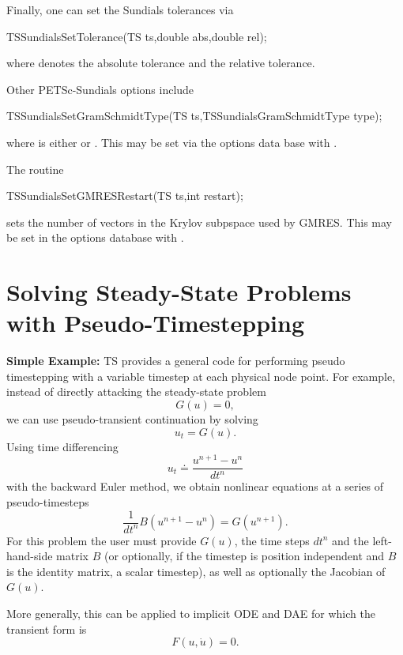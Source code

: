 Finally, one can set the Sundials tolerances via
\begin{tabbing}
 TSSundialsSetTolerance(TS ts,double abs,double rel);
\end{tabbing}
where  denotes the absolute tolerance and 
the relative tolerance.

Other PETSc-Sundials options include
\begin{tabbing}
  TSSundialsSetGramSchmidtType(TS ts,TSSundialsGramSchmidtType type);
\end{tabbing}
where  is either  or
.
 This may be set via the options data base
with .

The routine
\begin{tabbing}
  TSSundialsSetGMRESRestart(TS ts,int restart);
\end{tabbing}
sets the number of vectors in the Krylov subpspace used by GMRES.
This may be set in the options
database with  . 

 \chapter{Solving Steady-State Problems with Pseudo-Timestepping}

\vspace{.2cm}

\noindent
{\bf Simple Example:}
TS provides a general code for performing pseudo timestepping
with a variable timestep at each physical node point. For example, instead of
directly attacking the steady-state problem
\[
           G(u) = 0,
\]
we can use pseudo-transient continuation by solving
\[
           u_t = G(u).
\]
Using time differencing
\[
   u_t \doteq \frac{{u^{n+1}} - {u^{n}} }{dt^{n}}
\]
with the backward Euler method, we obtain
nonlinear equations at a series of pseudo-timesteps
\[
           \frac{1}{dt^n} B (u^{n+1} - u^{n} ) = G(u^{n+1}).
\]
For this problem the user must provide $G(u)$,
the time steps $dt^{n}$ and the left-hand-side matrix $B$
(or optionally, if the timestep is position independent and $B$ is the
identity matrix,
a scalar timestep), as well as optionally the Jacobian of $G(u)$.

More generally, this can be applied to implicit ODE and DAE for which
the transient form is
\[
  F(u,\dot{u}) = 0.
\]


